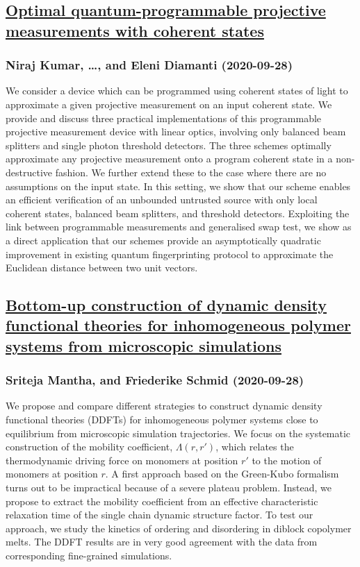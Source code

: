 \subsection*{\href{http://arxiv.org/abs/2009.13201v1}{Optimal quantum-programmable projective measurements with coherent  states}}
\subsubsection*{Niraj Kumar, \dots, and Eleni Diamanti (2020-09-28)}
We consider a device which can be programmed using coherent states of light
to approximate a given projective measurement on an input coherent state. We
provide and discuss three practical implementations of this programmable
projective measurement device with linear optics, involving only balanced beam
splitters and single photon threshold detectors. The three schemes optimally
approximate any projective measurement onto a program coherent state in a
non-destructive fashion. We further extend these to the case where there are no
assumptions on the input state. In this setting, we show that our scheme
enables an efficient verification of an unbounded untrusted source with only
local coherent states, balanced beam splitters, and threshold detectors.
Exploiting the link between programmable measurements and generalised swap
test, we show as a direct application that our schemes provide an
asymptotically quadratic improvement in existing quantum fingerprinting
protocol to approximate the Euclidean distance between two unit vectors.

\subsection*{\href{http://arxiv.org/abs/2009.13197v1}{Bottom-up construction of dynamic density functional theories for  inhomogeneous polymer systems from microscopic simulations}}
\subsubsection*{Sriteja Mantha, and Friederike Schmid (2020-09-28)}
We propose and compare different strategies to construct dynamic density
functional theories (DDFTs) for inhomogeneous polymer systems close to
equilibrium from microscopic simulation trajectories. We focus on the
systematic construction of the mobility coefficient, $\Lambda(r,r')$, which
relates the thermodynamic driving force on monomers at position $r'$ to the
motion of monomers at position $r$. A first approach based on the Green-Kubo
formalism turns out to be impractical because of a severe plateau problem.
Instead, we propose to extract the mobility coefficient from an effective
characteristic relaxation time of the single chain dynamic structure factor. To
test our approach, we study the kinetics of ordering and disordering in diblock
copolymer melts. The DDFT results are in very good agreement with the data from
corresponding fine-grained simulations.


